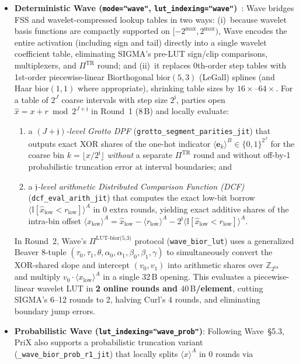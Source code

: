 \documentclass[11pt]{article}
\newcommand{\shareA}[1]{\langle #1 \rangle^{A}}
\newcommand{\shareB}[1]{\langle #1 \rangle^{B}}
\newcommand{\Zring}{\mathbb{Z}_{2^{64}}}
\begin{document}
\begin{itemize}
    \item \textbf{Deterministic Wave (\texttt{mode="wave"}, \texttt{lut\_indexing="wave"})}~\cite{reis2025wave}: Wave bridges FSS and wavelet-compressed lookup tables in two ways: (i)~because wavelet basis functions are compactly supported on $[-2^{\max}, 2^{\max})$, Wave encodes the entire activation (including sign and tail) directly into a single wavelet coefficient table, eliminating SIGMA's pre-LUT sign/clip comparisons, multiplexers, and $\Pi^{\text{TR}}$ round; and (ii)~it replaces 0th-order step tables with 1st-order piecewise-linear Biorthogonal $\text{bior}(5,3)$ (LeGall) splines (and Haar $\text{bior}(1,1)$ where appropriate), shrinking table sizes by $16\times$--$64\times$. For a table of $2^J$ coarse intervals with step size $2^{\mathfrak{j}}$, parties open $\hat{x} = x + r \bmod 2^{J+\mathfrak{j}}$ in Round~1 ($8\,\text{B}$) and locally evaluate:
    \begin{enumerate}
        \item a \emph{$(J+\mathfrak{j})$-level Grotto DPF} (\texttt{grotto\_segment\_parities\_jit}) that outputs exact XOR shares of the one-hot indicator $\shareB{\mathbf{e}_k} \in \{0,1\}^{2^J}$ for the coarse bin $k = \lfloor x / 2^{\mathfrak{j}} \rfloor$ \emph{without} a separate $\Pi^{\text{TR}}$ round and without off-by-1 probabilistic truncation error at interval boundaries; and
        \item a \emph{$\mathfrak{j}$-level arithmetic Distributed Comparison Function (DCF)} (\texttt{dcf\_eval\_arith\_jit}) that computes the exact low-bit borrow $\shareA{\mathbb{I}[\hat{x}_{\text{low}} < r_{\text{low}}]}$ in 0 extra rounds, yielding exact additive shares of the intra-bin offset $\shareA{x_{\text{low}}} = \hat{x}_{\text{low}} - \shareA{r_{\text{low}}} - 2^{\mathfrak{j}}\shareA{\mathbb{I}[\hat{x}_{\text{low}} < r_{\text{low}}]}$.
    \end{enumerate}
    In Round~2, Wave's $\Pi^{\text{LUT-bior(5,3)}}$ protocol (\texttt{wave\_bior\_lut}) uses a generalized Beaver 8-tuple $(\tau_0, \tau_1, \theta, \alpha_0, \alpha_1, \beta_0, \beta_1, \gamma)$ to simultaneously convert the XOR-shared slope and intercept $(v_0, v_1)$ into arithmetic shares over $\Zring$ and multiply $v_0 \cdot \shareA{x_{\text{low}}}$ in a single $32\,\text{B}$ opening. This evaluates a piecewise-linear wavelet LUT in \textbf{2 online rounds and $40\,\text{B}$/element}, cutting SIGMA's 6--12 rounds to 2, halving Curl's 4 rounds, and eliminating boundary jump errors.
    \item \textbf{Probabilistic Wave (\texttt{lut\_indexing="wave\_prob"})}: Following Wave~\S5.3, PriX also supports a probabilistic truncation variant (\texttt{\_wave\_bior\_prob\_r1\_jit}) that locally splits $\shareA{x}$ in 0 rounds via

\end{itemize}
\end{document}
